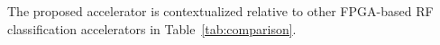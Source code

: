 \documentclass[conference]{IEEEtran}
\begin{document}

The proposed accelerator is contextualized relative to other FPGA-based RF classification accelerators in Table~\ref{tab:comparison}.
\end{document}

